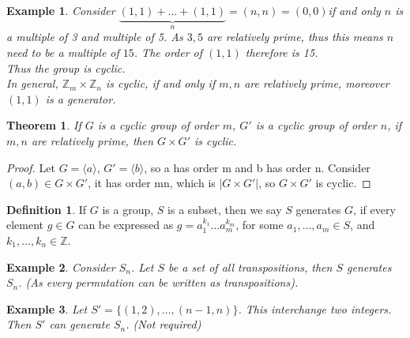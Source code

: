 \documentclass{article}
\theoremstyle{MyNonumberplain}
\theoremstyle{break}
\newtheorem*{proof}{Proof. }
\newcommand{\cyclic}[1]{\langle #1 \rangle}
\theoremstyle{break}
\newtheorem{theorem}{Theorem}[section]
\newtheorem{example}{Example}[section]
\theoremstyle{break}
\theoremstyle{definition}
\theoremstyle{break}
\newtheorem{definition}{Definition}[section]
\begin{document}
\begin{expbox}
\begin{example}
        Consider $\underbrace{(1,1)+...+(1,1)}_{n}=(n,n)=(0,0)$if and only $n$ is a multiple of 3 and multiple of 5. As $3, 5$ are
        relatively prime, thus this means $n$ need to be a multiple of $15$. The order
        of $(1, 1)$ therefore is 15.\\

        Thus the group is cyclic.\\

        In general, $\mathbb{Z}_m \times \mathbb{Z}_n$ is cyclic, if and only if $m,
        n$ are relatively prime, moreover $(1, 1)$ is a generator. 
    \end{example}
\end{expbox}

\begin{thmbox}
    \begin{theorem}
        If $G$ is a cyclic group of order $m$, $G'$ is a cyclic group of order $n$, if
        $m, n$ are relatively prime, then $G \times G'$ is cyclic.
    \end{theorem}
    \begin{prfbox}
        \begin{proof}
            Let $G = \cyclic{a}$, $G' = \cyclic{b}$, so a has order m and b has order n. Consider $(a, b) \in G \times G'$, it
            has order mn, which is $|G \times G'|$, so $G \times G'$ is cyclic.
        \end{proof}
    \end{prfbox}
\end{thmbox}

\begin{defbox}
    \begin{definition}
        If $G$ is a group, $S$ is a subset, then we say $S$ generates $G$, if every
        element $g \in G$ can be expressed as $g = a^{k_1}_1 \ldots a^{k_m}_m$, for
        some $a_1, \ldots, a_m \in S$, and $k_1, \ldots, k_n \in \mathbb{Z}$.
    \end{definition}
\end{defbox}

\begin{expbox}
    \begin{example}
        Consider $S_n$. Let $S$ be a set of all transpositions, then $S$ generates
        $S_n$. (As every permutation can be written as transpositions). 
    \end{example}
\end{expbox}
\begin{expbox}
    \begin{example}
        Let $S' = \{ (1, 2), \ldots, (n - 1, n) \}$. This interchange two integers.
        Then $S'$ can generate $S_n$. (Not required)
    \end{example}
\end{expbox}
\end{document}
